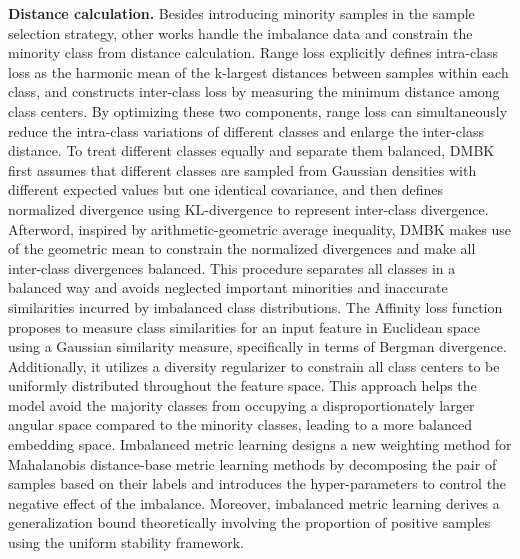 \textbf{Distance calculation.}
Besides introducing minority samples in the sample selection strategy, other works handle the imbalance data and constrain the minority class from distance calculation.
Range loss \cite{zhang2017range} explicitly defines intra-class loss as the harmonic mean of the k-largest distances between samples within each class, and constructs inter-class loss by measuring the minimum distance among class centers. By optimizing these two components, range loss can simultaneously reduce the intra-class variations of different classes and enlarge the inter-class distance.
To treat different classes equally and separate them balanced, DMBK \cite{feng2018learning} first assumes that different classes are sampled from Gaussian densities with different expected values but one identical covariance, and then defines normalized divergence using KL-divergence to represent inter-class divergence. Afterword, inspired by arithmetic-geometric average inequality, DMBK makes use of the geometric mean to constrain the normalized divergences and make all inter-class divergences balanced. This procedure separates all classes in a balanced way and avoids neglected important minorities and inaccurate similarities incurred by imbalanced class distributions.
The Affinity loss function \cite{hayat2019gaussian} proposes to measure class similarities for an input feature in Euclidean space using a Gaussian similarity measure, specifically in terms of Bergman divergence. Additionally, it utilizes a diversity regularizer to constrain all class centers to be uniformly distributed throughout the feature space. This approach helps the model avoid the majority classes from occupying a disproportionately larger angular space compared to the minority classes, leading to a more balanced embedding space.
Imbalanced metric learning \cite{gautheron2020metric} designs a new weighting method for Mahalanobis distance-base metric learning methods by decomposing the pair of samples based on their labels and introduces the hyper-parameters to control the negative effect of the imbalance. Moreover, imbalanced metric learning derives a generalization bound theoretically involving the proportion of positive samples using the uniform stability framework. 



